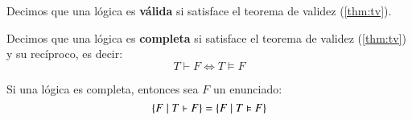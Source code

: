 \begin{dfn}
    Decimos que una lógica es \textbf{válida} si satisface el teorema de validez (\ref{thm:tv}).
\end{dfn}

\begin{dfn}
    Decimos que una lógica es \textbf{completa} si satisface el teorema de validez (\ref{thm:tv}) y su recíproco, es decir:
    $$
        T \vdash F \iff T \vDash F
    $$
\end{dfn}
\begin{obs}
    Si una lógica es completa, entonces sea $F$ un enunciado:
    $$
        \left\{F \mid T \vdash F\right\} = \left\{F \mid T \vDash F\right\}
    $$
\end{obs}

